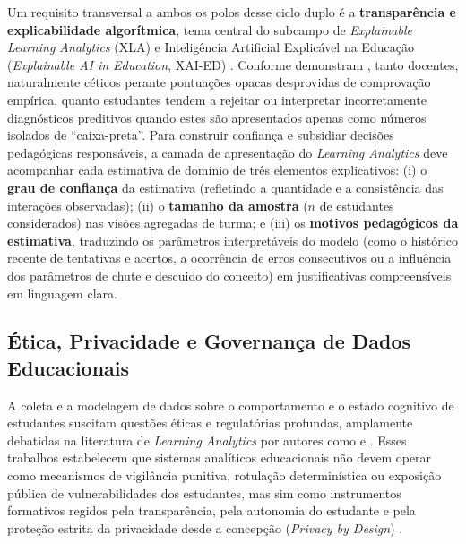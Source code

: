 Um requisito transversal a ambos os polos desse ciclo duplo é a \textbf{transparência e explicabilidade algorítmica}, tema central do subcampo de \textit{Explainable Learning Analytics} (XLA) e Inteligência Artificial Explicável na Educação (\textit{Explainable AI in Education}, XAI-ED) \cite{khosravi_explainable_2022, cao_multi-granularity_2025}. Conforme demonstram , tanto docentes, naturalmente céticos perante pontuações opacas desprovidas de comprovação empírica, quanto estudantes tendem a rejeitar ou interpretar incorretamente diagnósticos preditivos quando estes são apresentados apenas como números isolados de ``caixa-preta''. Para construir confiança e subsidiar decisões pedagógicas responsáveis, a camada de apresentação do \textit{Learning Analytics} deve acompanhar cada estimativa de domínio de três elementos explicativos: (i) o \textbf{grau de confiança} da estimativa (refletindo a quantidade e a consistência das interações observadas); (ii) o \textbf{tamanho da amostra} ($n$ de estudantes considerados) nas visões agregadas de turma; e (iii) os \textbf{motivos pedagógicos da estimativa}, traduzindo os parâmetros interpretáveis do modelo (como o histórico recente de tentativas e acertos, a ocorrência de erros consecutivos ou a influência dos parâmetros de chute e descuido do conceito) em justificativas compreensíveis em linguagem clara.

\subsection{Ética, Privacidade e Governança de Dados Educacionais}
\label{subsec:etica-privacidade-la}

A coleta e a modelagem de dados sobre o comportamento e o estado cognitivo de estudantes suscitam questões éticas e regulatórias profundas, amplamente debatidas na literatura de \textit{Learning Analytics} por autores como  e . Esses trabalhos estabelecem que sistemas analíticos educacionais não devem operar como mecanismos de vigilância punitiva, rotulação determinística ou exposição pública de vulnerabilidades dos estudantes, mas sim como instrumentos formativos regidos pela transparência, pela autonomia do estudante e pela proteção estrita da privacidade desde a concepção (\textit{Privacy by Design}) \cite{cavoukian_privacy_2009}.

